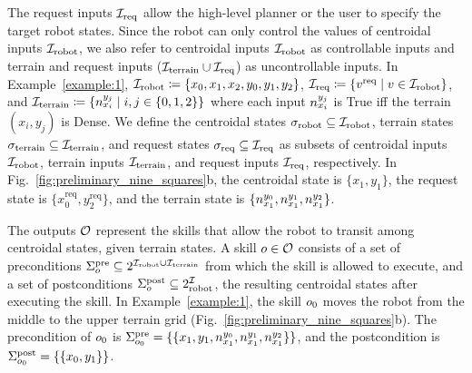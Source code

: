 \documentclass[letterpaper, 10 pt, conference]{ieeeconf}
\begin{document}
%
The request inputs ${\mathcal I}_{\textrm{req}}$ allow the high-level planner or the user to specify the target robot states.
%
Since the robot can only control the values of centroidal inputs ${\mathcal I}_{\textrm{robot}}$, 
we also refer to centroidal inputs ${\mathcal I}_{\textrm{robot}}$ as controllable inputs
and
terrain and request inputs (${\mathcal I}_{\textrm{terrain}}\cup {\mathcal I}_{\textrm{req}}$) as uncontrollable inputs.
%
In Example~\ref{example:1},
${\mathcal I}_{\textrm{robot}} \coloneqq \{x_0, x_1, x_2, y_0, y_1, y_2\}$,
${\mathcal I}_{\textrm{req}} \coloneqq \{v^\textrm{req} \mid v \in {\mathcal I}_{\textrm{robot}}\}$,
and
${\mathcal I}_{\textrm{terrain}} \coloneqq \{n_{x_i}^{y_j} \mid i,j\in \{0, 1, 2\}\}$
where each input $n_{x_i}^{y_j}$ is True iff the terrain $(x_i, y_j)$ is Dense.
%
We define 
the
centroidal states $\sigma_{\textrm{robot}} \subseteq {\mathcal I}_{\textrm{robot}}$, 
terrain states $\sigma_{\textrm{terrain}} \subseteq {\mathcal I}_{\textrm{terrain}}$, 
and request states
$\sigma_{\textrm{req}} \subseteq {\mathcal I}_{\textrm{req}}$
as
subsets of 
centroidal inputs ${\mathcal I}_{\textrm{robot}}$, 
terrain inputs ${\mathcal I}_{\textrm{terrain}}$, 
and request inputs ${\mathcal I}_{\textrm{req}}$,
respectively.
%
%
In Fig.~\ref{fig:preliminary_nine_squares}b,
the centroidal state is $\{x_1, y_1\}$,
the request state is $\{x_0^{\textrm{req}}, y_2^{\textrm{req}}\}$,
and the terrain state is $\{n_{x_1}^{y_0}, n_{x_1}^{y_1}, n_{x_1}^{y_2}\}$.


The outputs
${\mathcal O}$ 
represent
the skills 
that allow the robot to transit among centroidal states,
given terrain states.
A skill $o \in {\mathcal O}$
consists of 
a set of preconditions $\Sigma_{o}^{\textrm{pre}} \subseteq 2^{{\mathcal I}_{\textrm{robot}} \cup {\mathcal I}_{\textrm{terrain}}}$
from which the skill is allowed to execute,
and a set of postconditions $\Sigma_{o}^{\textrm{post}} \subseteq 2^{\mathcal I}_{\textrm{robot}}$, the resulting centroidal states after executing the skill.
%
In Example~\ref{example:1},
the skill $o_{0}$ moves the robot from the middle to the upper terrain grid (Fig.~\ref{fig:preliminary_nine_squares}b).
The precondition of $o_{0}$ is
$\Sigma_{o_{0}}^{\textrm{pre}} = \{\{x_1, y_1, n_{x_1}^{y_0}, n_{x_1}^{y_1}, n_{x_1}^{y_2}\}\}$, and
the postcondition is
$\Sigma_{o_{0}}^{\textrm{post}} = \{\{x_0, y_1\}\}$.
\end{document}
